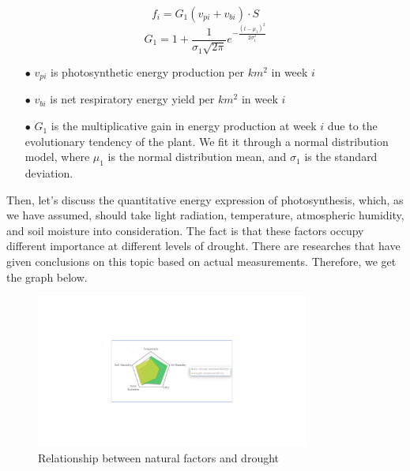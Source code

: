 \documentclass[12pt]{article}  %
\newenvironment{shrinkeq}[1]
{ \bgroup
	\addtolength\abovedisplayshortskip{#1}
	\addtolength\abovedisplayskip{#1}
	\addtolength\belowdisplayshortskip{#1}
	\addtolength\belowdisplayskip{#1}}
{\egroup\ignorespacesafterend}
\begin{document}
\begin{shrinkeq}{-1ex}
	\begin{equation}
    \label{eq:eq2}
	   f_i=G_1(v_{pi}+v_{bi})\cdot S
	\end{equation}
\end{shrinkeq}
\begin{shrinkeq}{-1ex}
	\begin{equation}
    \label{eq:eq3}
	   G_1 = 1+\frac{1}{\sigma_1\sqrt{2\pi}}e^{-\frac{(t-\mu_1)^2}{2\sigma_1^2}}
	\end{equation}
\end{shrinkeq}

\begin{itemize}
\vspace{-0.4cm}
\item[$\bullet$] \textbf{$v_{pi}$ }is photosynthetic energy production per $km^2$ in week $i$
\vspace{-0.2cm}
\item[$\bullet$] \textbf{$v_{bi}$ }is net respiratory energy yield per $km^2$ in week $i$
\vspace{-0.2cm}
\item[$\bullet$] \textbf{$G_1$ }is the multiplicative gain in energy production at week $i$ due to the evolutionary tendency of the plant. We fit it through a normal distribution model, where $\mu_1$ is the normal distribution mean, and $\sigma_1$ is the standard deviation.
\end{itemize}

\vspace{-0.6cm}
Then, let's discuss the quantitative energy expression of photosynthesis, which, as we have assumed, should take light radiation, temperature, atmospheric humidity, and soil moisture into consideration. The fact is that these factors occupy different importance at different levels of drought. There are researches{\cite{6}}{\cite{14}} that have given conclusions on this topic based on actual measurements. Therefore, we get the graph below.

\begin{figure}[htbp]
	\centering
	\includegraphics[width=0.8\textwidth]{easymcm/img/pollu.pdf}
	\caption{Relationship between natural factors and drought}
 \label{fig:work1}
\end{figure}
\end{document}
